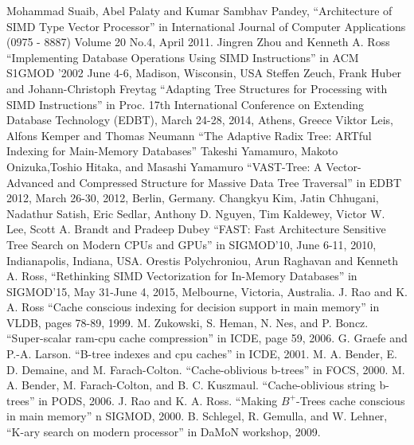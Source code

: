 \documentclass[conference]{IEEEtran}
\begin{document}
\begin{thebibliography}{00}
Mohammad Suaib, Abel Palaty and Kumar Sambhav Pandey, ``Architecture of SIMD Type Vector Processor'' in International Journal of Computer Applications (0975 - 8887) Volume 20 No.4, April 2011.
 Jingren Zhou and Kenneth A. Ross  ``Implementing Database Operations Using SIMD Instructions'' in ACM S1GMOD '2002 June 4-6, Madison, Wisconsin, USA
 Steffen Zeuch, Frank Huber and Johann-Christoph Freytag  ``Adapting Tree Structures for Processing with SIMD Instructions'' in Proc. 17th International Conference on Extending Database Technology (EDBT), March 24-28, 2014, Athens, Greece
 Viktor Leis, Alfons Kemper and Thomas Neumann ``The Adaptive Radix Tree: ARTful Indexing for Main-Memory Databases''
 Takeshi Yamamuro, Makoto Onizuka,Toshio Hitaka, and Masashi Yamamuro ``VAST-Tree: A Vector-Advanced and Compressed Structure for Massive Data Tree Traversal'' in EDBT 2012, March 26-30, 2012, Berlin, Germany.
 Changkyu Kim, Jatin Chhugani, Nadathur Satish, Eric Sedlar, Anthony D. Nguyen,
Tim Kaldewey, Victor W. Lee, Scott A. Brandt and Pradeep Dubey ``FAST: Fast Architecture Sensitive Tree Search
on Modern CPUs and GPUs'' in SIGMOD’10, June 6-11, 2010, Indianapolis, Indiana, USA.
Orestis Polychroniou, Arun Raghavan and Kenneth A. Ross, ``Rethinking SIMD Vectorization for In-Memory Databases'' in SIGMOD’15, May 31-June 4, 2015, Melbourne, Victoria, Australia.
 J. Rao and K. A. Ross ``Cache conscious indexing for decision support in main memory'' in VLDB, pages 78-89, 1999.
  M. Zukowski, S. Heman, N. Nes, and P. Boncz. ``Super-scalar ram-cpu cache compression'' in ICDE, page 59, 2006.
 G. Graefe and P.-A. Larson. ``B-tree indexes and cpu
caches'' in ICDE, 2001.
 M. A. Bender, E. D. Demaine, and M. Farach-Colton. ``Cache-oblivious b-trees'' in FOCS, 2000.
 M. A. Bender, M. Farach-Colton, and B. C. Kuszmaul.
``Cache-oblivious string b-trees'' in PODS, 2006.
 J. Rao and K. A. Ross. ``Making $B^+$-Trees cache conscious in main memory'' n SIGMOD, 2000.
 B. Schlegel, R. Gemulla, and W. Lehner, ``K-ary search on modern processor'' in DaMoN workshop, 2009.
\end{thebibliography}
\end{document}
